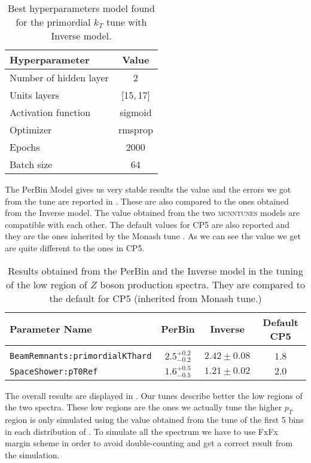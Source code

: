 \begin{table}[!htb]
	\centering
	\begin{tabular}{ l | c }
	Hyperparameter & Value\\[2pt]\hline\hline
	Number of hidden layer & 2 \\[2pt]
	Units layers & [15,\,17] \\[2pt]
	Activation function & sigmoid \\[2pt]
	Optimizer & rmsprop\\[2pt]
	Epochs & 2000\\[2pt]
	Batch size & 64\\[2pt]
	\end{tabular}
	\caption{Best hyperparameters model found for the primordial $k_T$ tune with Inverse model.}
	\label{table:hyperpar_PrimkT}
\end{table}


\noindent The PerBin Model gives us very stable results the value and the errors we got from the tune are reported in .  
These are also compared to the ones obtained from the Inverse model. The value obtained from the two \textsc{mcnntunes} models are compatible with each other. The default values for CP5 are also reported and they are the ones inherited by the Monash tune \cite{Monash}. As we can see the value we get are quite different to the ones in CP5.  

\begin{table}
	\centering
\begin{tabular}{l | c | c | c}
Parameter Name & PerBin & Inverse & Default CP5\\ 
\hline \hline
\\[-0.85em]
	\texttt{BeamRemnants:primordialKThard} & $ 2.5^{+0.2}_{-0.2} $ & $ 2.42\pm0.08 $ & $1.8$\\
	\texttt{SpaceShower:pT0Ref} & $ 1.6^{+0.5}_{-0.5} $ & $ 1.21\pm0.02  $ & $2.0$
\end{tabular}
\caption{Results obtained from the PerBin and the Inverse model in the tuning of the low region of $Z$ boson production spectra. They are compared to the default for CP5 (inherited from Monash tune.)}
\label{table:Primordial_kT_results}
\end{table}	

\medskip

The overall results are displayed in . Our tunes describe better the low regions of the two spectra. These low regions are the ones we actually tune the higher $p_T$ region is only simulated using the value obtained from the tune of the first 5 bins in each distribution of  . To simulate all the spectrum we have to use FxFx margin scheme in order to avoid double-counting and get a correct result from the simulation.


